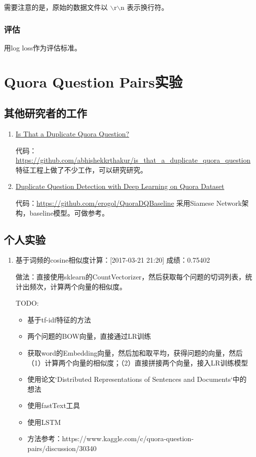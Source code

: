 需要注意的是，原始的数据文件以 $\backslash$r$\backslash$n 表示换行符。

\subsubsection{评估}
用log loss作为评估标准。

\section{Quora Question Pairs实验}

\subsection{其他研究者的工作}

\begin{enumerate}
    \item \href{https://www.linkedin.com/pulse/duplicate-quora-question-abhishek-thakur}{Is That a Duplicate Quora Question?}

        代码：\url{https://github.com/abhishekkrthakur/is_that_a_duplicate_quora_question}
        特征工程上做了不少工作，可以研究研究。

    \item \href{http://www.erogol.com/duplicate-question-detection-deep-learning/}{Duplicate Question Detection with Deep Learning on Quora Dataset}

        代码：\url{https://github.com/erogol/QuoraDQBaseline}
        采用Siamese Network架构，baseline模型。可做参考。

\end{enumerate}


\subsection{个人实验}
\begin{enumerate}
\item 基于词频的cosine相似度计算：[2017-03-21 21:20]
成绩：0.75402

做法：直接使用sklearn的CountVectorizer，然后获取每个问题的切词列表，统计出频次，计算两个向量的相似度。

TODO: 
\begin{itemize}
\item 基于tf-idf特征的方法
\item 两个问题的BOW向量，直接通过LR训练
\item 获取word的Embedding向量，然后加和取平均，获得问题的向量，然后（1）计算两个向量的相似度；（2）直接拼接两个向量，接入LR训练模型
\item 使用论文`Distributed Representations of Sentences and Documents`中的想法
\item 使用fastText工具
\item 使用LSTM
\item 方法参考：https://www.kaggle.com/c/quora-question-pairs/discussion/30340
\end{itemize}



\end{enumerate}

